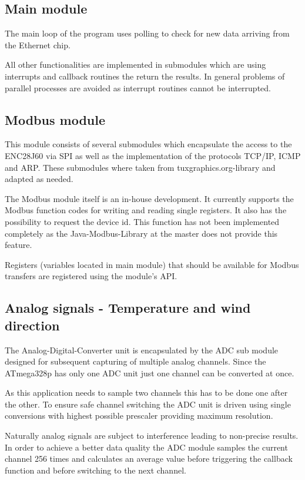 \subsection{Main module}
The main loop of the program uses polling to check for new data arriving from the Ethernet chip.

All other functionalities are implemented in submodules which are using interrupts and callback routines the return the results. In general problems of parallel processes are avoided as interrupt routines cannot be interrupted.

\subsection{Modbus module}
This module consists of several submodules which encapsulate the access to the ENC28J60 via SPI as well as the implementation of the protocols TCP/IP, ICMP and ARP. These submodules where taken from tuxgraphics.org-library and adapted as needed.

The Modbus module itself is an in-house development. It currently supports the Modbus function codes for writing and reading single registers. It also has the possibility to request the device id. This function has not been implemented completely as the Java-Modbus-Library at the master does not provide this feature.

Registers (variables located in main module) that should be available for Modbus transfers are registered using the module's API.

\subsection{Analog signals - Temperature and wind direction}
The Analog-Digital-Converter unit is encapsulated by the ADC sub module designed for subsequent capturing of multiple analog channels.
Since the ATmega328p has only one ADC unit just one channel can be converted at once.

As this application needs to sample two channels this has to be done one after the other. To ensure safe channel switching the ADC unit is driven using single conversions with highest possible prescaler providing maximum resolution.

Naturally analog signals are subject to interference leading to non-precise results. In order to achieve a better data quality the ADC module samples the current channel 256 times and calculates an average value before triggering the callback function and before switching to the next channel.


